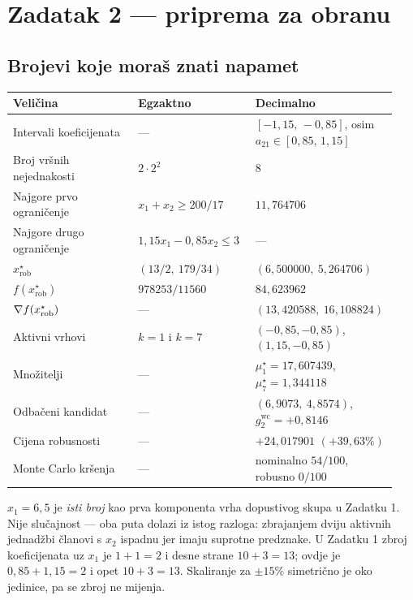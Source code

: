 \chapter{Zadatak 2 --- priprema za obranu}
\label{ch:z2-obrana}

\section{Brojevi koje moraš znati napamet}
\label{sec:z2o-brojevi}

\begin{longtable}{@{}p{0.32\linewidth} p{0.30\linewidth} p{0.32\linewidth}@{}}
\toprule
\textbf{Veličina} & \textbf{Egzaktno} & \textbf{Decimalno} \\
\midrule
\endhead
Intervali koeficijenata & --- & $[-1{,}15,\,-0{,}85]$, osim $a_{21} \in [0{,}85,\,1{,}15]$ \\
Broj vršnih nejednakosti & $2 \cdot 2^2$ & $8$ \\
Najgore prvo ograničenje & $x_1 + x_2 \geq 200/17$ & $11{,}764706$ \\
Najgore drugo ograničenje & $1{,}15x_1 - 0{,}85x_2 \leq 3$ & --- \\
$x_{\mathrm{rob}}^{\star}$ & $(13/2,\ 179/34)$ & $(6{,}500000,\ 5{,}264706)$ \\
$f(x_{\mathrm{rob}}^{\star})$ & $978253/11560$ & $84{,}623962$ \\
$\nabla f(x_{\mathrm{rob}}^{\star})$ & --- & $(13{,}420588,\ 16{,}108824)$ \\
Aktivni vrhovi & $k = 1$ i $k = 7$ & $(-0{,}85,-0{,}85)$, $(1{,}15,-0{,}85)$ \\
Množitelji & --- & $\mu_1^{\star} = 17{,}607439$, $\mu_7^{\star} = 1{,}344118$ \\
Odbačeni kandidat & --- & $(6{,}9073,\ 4{,}8574)$, $g_2^{\mathrm{wc}} = +0{,}8146$ \\
Cijena robusnosti & --- & $+24{,}017901$ $(+39{,}63\%)$ \\
Monte Carlo kršenja & --- & nominalno $54/100$, robusno $0/100$ \\
\bottomrule
\end{longtable}

\begin{izgovor}
$x_1 = 6{,}5$ je \emph{isti broj} kao prva komponenta vrha dopustivog skupa u
Zadatku 1. Nije slučajnost --- oba puta dolazi iz istog razloga: zbrajanjem
dviju aktivnih jednadžbi članovi s $x_2$ ispadnu jer imaju suprotne predznake.
U Zadatku 1 zbroj koeficijenata uz $x_1$ je $1 + 1 = 2$ i desne strane
$10 + 3 = 13$; ovdje je $0{,}85 + 1{,}15 = 2$ i opet $10 + 3 = 13$. Skaliranje
za $\pm15\%$ simetrično je oko jedinice, pa se zbroj ne mijenja.
\end{izgovor}

